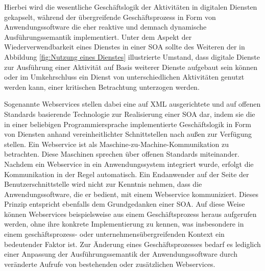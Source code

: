 Hierbei wird die wesentliche Geschäftslogik der Aktivitäten in digitalen Diensten gekapselt, während der übergreifende Geschäftsprozess in Form von Anwendungssoftware die eher reaktive und demnach dynamische Ausführungssemantik implementiert. 
\cite{Teusch.2016}
Unter dem Aspekt der Wiederverwendbarkeit eines Dienstes in einer \ac{SOA} sollte des Weiteren der in Abbildung \ref{fig:Nutzung eines Dienstes} illustrierte Umstand, dass digitale Dienste zur Ausführung einer Aktivität auf Basis weiterer Dienste aufgebaut sein können oder im Umkehrschluss ein Dienst von unterschiedlichen Aktivitäten genutzt werden kann, einer kritischen Betrachtung unterzogen werden.
\cite{Masak.2007}

Sogenannte Webservices stellen dabei eine auf \ac{XML} ausgerichtete und auf offenen Standards basierende Technologie zur Realisierung einer \ac{SOA} dar, indem sie die in einer beliebigen Programmiersprache implementierte Geschäftslogik in Form von Diensten anhand vereinheitlichter Schnittstellen nach außen zur Verfügung stellen.
\cite{Masak.2005}
Ein Webservice ist als Maschine-zu-Machine-Kommunikation zu betrachten. Diese Maschinen sprechen über offenen Standards miteinander. 
\cite{Finger.2009b}
Nachdem ein Webservice in ein Anwendungssystem integriert wurde, erfolgt die Kommunikation in der Regel automatisch. 
Ein Endanwender auf der Seite der Benutzerschnittstelle wird nicht zur Kenntnis nehmen, dass die Anwendungssoftware, die er bedient, mit einem Webservice kommuniziert. Dieses Prinzip entspricht ebenfalls dem Grundgedanken einer \ac{SOA}.
\cite{Teusch.2016}
Auf diese Weise können Webservices beispielsweise aus einem Geschäftsprozess heraus aufgerufen werden, ohne ihre konkrete Implementierung zu kennen, was insbesondere in einem geschäftsprozess- oder unternehmensübergreifenden Kontext ein bedeutender Faktor ist. Zur Änderung eines Geschäftsprozesses bedarf es lediglich einer Anpassung der Ausführungssemantik der Anwendungssoftware durch veränderte Aufrufe von bestehenden oder zusätzlichen Webservices. 



